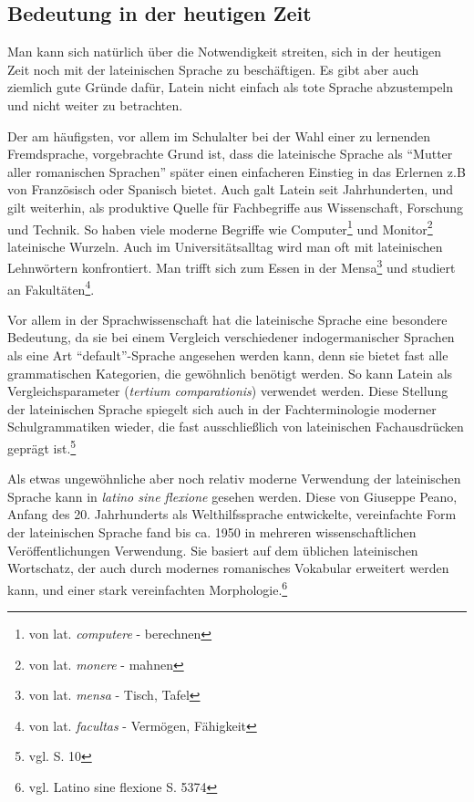 \subsection{Bedeutung in der heutigen Zeit}
\label{subsec:bedeutung}
Man kann sich natürlich über die Notwendigkeit streiten, sich in der heutigen Zeit noch mit der lateinischen Sprache zu beschäftigen. Es gibt aber auch ziemlich gute Gründe dafür, Latein nicht einfach als tote Sprache abzustempeln und nicht weiter zu betrachten. \par
Der am häufigsten, vor allem im Schulalter bei der Wahl einer zu lernenden Fremdsprache, vorgebrachte Grund ist, dass die lateinische Sprache als "`Mutter aller romanischen Sprachen"' später einen einfacheren Einstieg in das Erlernen z.B von Französisch oder Spanisch bietet. Auch galt Latein seit Jahrhunderten, und gilt weiterhin, als produktive Quelle für Fachbegriffe aus Wissenschaft, Forschung und Technik. So haben viele moderne Begriffe wie Computer\footnote{von lat. \textit{computere} - berechnen} und Monitor\footnote{von lat. \textit{monere} - mahnen} lateinische Wurzeln. Auch im Universitätsalltag wird man oft mit lateinischen Lehnwörtern konfrontiert. Man trifft sich zum Essen in der Mensa\footnote{von lat. \textit{mensa} - Tisch, Tafel} und studiert an Fakultäten\footnote{von lat. \textit{facultas} - Vermögen, Fähigkeit}. \par
Vor allem in der Sprachwissenschaft hat die lateinische Sprache eine besondere Bedeutung, da sie bei einem Vergleich verschiedener indogermanischer Sprachen als eine Art "`default"'-Sprache angesehen werden kann, denn sie bietet fast alle grammatischen Kategorien, die gewöhnlich benötigt werden. So kann Latein als Vergleichsparameter (\textit{tertium comparationis}) verwendet werden. Diese Stellung der lateinischen Sprache spiegelt sich auch in der Fachterminologie moderner Schulgrammatiken wieder, die fast ausschließlich von lateinischen Fachausdrücken geprägt ist.\footnote{vgl. \cite{MUELLER-LANCE2006} S. 10} \par
Als etwas ungewöhnliche aber noch relativ moderne Verwendung der lateinischen Sprache kann in \textit{latino sine flexione} gesehen werden. Diese von Giuseppe Peano, Anfang des 20. Jahrhunderts als Welthilfssprache entwickelte, vereinfachte Form der lateinischen Sprache fand bis ca. 1950 in mehreren wissenschaftlichen Veröffentlichungen Verwendung. Sie basiert auf dem üblichen lateinischen Wortschatz, der auch durch modernes romanisches Vokabular erweitert werden kann, und einer stark vereinfachten Morphologie.\footnote{vgl. \cite{METZLER2004} Latino sine flexione S. 5374}